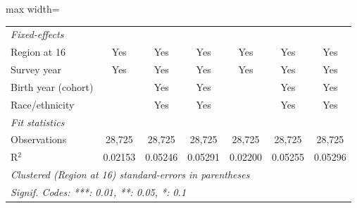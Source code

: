 \begin{adjustbox}{max width=\linewidth}
\begin{tabular}{lcccccc}
      \midrule
      \emph{Fixed-effects}\\
      Region at 16                             & Yes           & Yes           & Yes          & Yes          & Yes           & Yes\\  
      Survey year                              & Yes           & Yes           & Yes          & Yes          & Yes           & Yes\\  
      Birth year (cohort)                      &               & Yes           & Yes          &              & Yes           & Yes\\  
      Race/ethnicity                           &               & Yes           & Yes          &              & Yes           & Yes\\  
      \midrule
      \emph{Fit statistics}\\
      Observations                             & 28,725        & 28,725        & 28,725       & 28,725       & 28,725        & 28,725\\  
      R$^2$                                    & 0.02153       & 0.05246       & 0.05291      & 0.02200      & 0.05255       & 0.05296\\  
      \midrule \midrule
      \multicolumn{7}{l}{\emph{Clustered (Region at 16) standard-errors in parentheses}}\\
      \multicolumn{7}{l}{\emph{Signif. Codes: ***: 0.01, **: 0.05, *: 0.1}}\\
   \end{tabular}
      \end{adjustbox}
\vspace{3pt}\par{}
